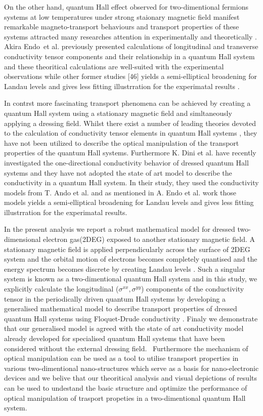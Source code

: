 On the other hand, quantum Hall effect \cite{girvin90} observed for two-dimentional fermions systems at low temperatures under strong staionary magnetic field manifest remarkable magneto-transport behaviours and transport properties of these systems attracted many researches attention in experimentally \cite{allerman95,tieke97,pan05} and theoretically \cite{ando72,ando74_1,ando74_2,ando74_3,ando74_4,ando82,endo09}.
Akira Endo et al. \cite{endo09} previously presented calculations of longitudinal and transverse conductivity tensor components and their relationship in a quantum Hall system and these theoritical calculations are well-suited with the experimental observations while other former studies [46] yields a semi-elliptical broadening for Landau levels and gives less fitting illustrration for the experimatal results \cite{endo09}.

In contrst more fascinating transport phenomena can be achieved by creating a quantum Hall system using a stationary magnetic field and simltaneously applying a dressing field.
Whilst there exist a number of leading theories devoted to the calculation of conductivity tensor elements in quantum Hall systems \cite{ando74_1,ando82,endo09}, they have not been utilized to describe the optical manipulation of the transport properties of the quantum Hall systems.
Furthermore K. Dini et al. \cite{dini16} have recently investigated the one-directional conductivity behavior of dressed quantum Hall systems and they have not adopted the state of art model to describe the conductivity in a quantum Hall system. In their study, they used the conductivity models from T. Ando et al. \cite{ando74_1,ando82} and as mentioned in A. Endo et al. work \cite{endo09} those models yields a semi-elliptical broadening for Landau levels and gives less fitting illustrration for the experimatal results.

In the present analysis we report a robust mathematical model for dressed two-dimensional electron gas(2DEG) exposed to another stationary magnetic field.
A stationary magnetic field is applied perpendicularly across the surface of 2DEG system and the orbital motion of electrons becomes completely quantised and the energy spectrum becomes discrete by creating Landau levels \cite{landau30}.
Such a singular system is known as a two-dimentional quantum Hall system and in this study, we explicitly calculate the longitudinal  ($\sigma^{xx},\sigma^{yy}$) components of the conductivity tensor in the periodically driven quantum Hall systems by developing a generalised mathematical model to describe transport properties of dressed quantum Hall systems using Floquet-Drude conductivity \cite{wackerl20}.
Finaly we demonstrate that our generalised model is agreed with the state of art conductivity model \cite{endo09} already developed for specialised quantum Hall systems that have been considered without the external dressing field. 
Furthermore the mechanism of optical manipulation can be used as a tool to utilise transport properties in various two-dimentional nano-structures which serve as a basis for nano-electronic devices and we belive that our theoritical analysis and visual depictions of results can be used to undestand the basic structure and optimize the performance of optical manipulation of trasport propeties in a two-dimentional quantum Hall system.
